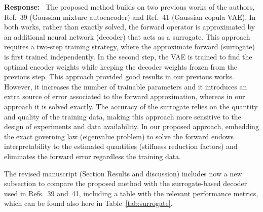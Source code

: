 \documentclass[11pt]{article}
\newenvironment{response}{\par\smallskip\noindent\color{resp}\textbf{Response:}\ }{\par}
\begin{document}
\begin{response}
The proposed method builds on two previous works of the authors, Ref.~39 (Gaussian mixture autoencoder) and Ref.~41 (Gaussian copula VAE).
In both works, rather than exactly solved, the forward operator is approximated by an additional neural network (decoder) that acts as a surrogate. 
This approach requires a two-step training strategy, where the approximate forward (surrogate) is first trained independently. 
In the second step, the VAE is trained to find the optimal encoder weights while keeping the decoder weights frozen from the previous step. 
This approach provided good results in our previous works. 
However, it increases the number of trainable parameters and it introduces an extra source of error associated to the forward approximation, whereas in our approach it is solved exactly. 
The accuracy of the surrogate relies on the quantity and quality of the training data, making this approach more sensitive to the design of experiments and data availability.  
In our proposed approach, embedding the exact governing law (eigenvalue problem) to solve the forward endows interpretability to the estimated quantities (stiffness reduction factors) and eliminates the forward error regardless the training data. 

The revised manuscript (Section Results and discussion) includes now a new subsection  to compare the proposed method with the surrogate-based decoder used in  Refs.~39 and~41, including a table with the relevant performance metrics, which can be found also here in Table~\ref{tab:surrogate}.



\end{response}
\end{document}
